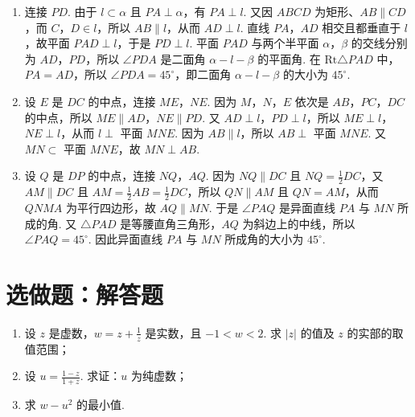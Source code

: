 \documentclass[UTF8,a4paper,oneside,11pt]{ctexbook}
\begin{document}
\begin{solution}
\begin{enumerate}
\item 连接 \(PD\). 由于 \(l\subset\alpha\) 且 \(PA\perp\alpha\)，有 \(PA\perp l\). 又因 \(ABCD\) 为矩形、\(AB\parallel CD\)，而 \(C\)，\(D\in l\)，所以 \(AB\parallel l\)，从而 \(AD\perp l\). 直线 \(PA\)，\(AD\) 相交且都垂直于 \(l\)，故平面 \(PAD\perp l\)，于是 \(PD\perp l\). 平面 \(PAD\) 与两个半平面 \(\alpha\)，\(\beta\) 的交线分别为 \(AD\)，\(PD\)，所以 \(\angle PDA\) 是二面角 \(\alpha-l-\beta\) 的平面角. 在 \(\mathrm{Rt}\triangle PAD\) 中，\(PA=AD\)，所以 \(\angle PDA=45^\circ\)，即二面角 \(\alpha-l-\beta\) 的大小为 \(45^\circ\).
\item 设 \(E\) 是 \(DC\) 的中点，连接 \(ME\)，\(NE\). 因为 \(M\)，\(N\)，\(E\) 依次是 \(AB\)，\(PC\)，\(DC\) 的中点，所以 \(ME\parallel AD\)，\(NE\parallel PD\). 又 \(AD\perp l\)，\(PD\perp l\)，所以 \(ME\perp l\)，\(NE\perp l\)，从而 \(l\perp\) 平面 \(MNE\). 因为 \(AB\parallel l\)，所以 \(AB\perp\) 平面 \(MNE\). 又 \(MN\subset\) 平面 \(MNE\)，故 \(MN\perp AB\).
\item 设 \(Q\) 是 \(DP\) 的中点，连接 \(NQ\)，\(AQ\). 因为 \(NQ\parallel DC\) 且 \(NQ=\frac{1}{2}DC\)，又 \(AM\parallel DC\) 且 \(AM=\frac{1}{2}AB=\frac{1}{2}DC\)，所以 \(QN\parallel AM\) 且 \(QN=AM\)，从而 \(QNMA\) 为平行四边形，故 \(AQ\parallel MN\). 于是 \(\angle PAQ\) 是异面直线 \(PA\) 与 \(MN\) 所成的角. 又 \(\triangle PAD\) 是等腰直角三角形，\(AQ\) 为斜边上的中线，所以 \(\angle PAQ=45^\circ\). 因此异面直线 \(PA\) 与 \(MN\) 所成角的大小为 \(45^\circ\).
\end{enumerate}
\end{solution}

\section{选做题：解答题}

\begin{problem}[A]
\begin{enumerate}
\item 设 \(z\) 是虚数，\(w=z+\frac{1}{z}\) 是实数，且 \(-1<w<2\). 求 \(\left|z\right|\) 的值及 \(z\) 的实部的取值范围；
\item 设 \(u=\frac{1-z}{1+z}\). 求证：\(u\) 为纯虚数；
\item 求 \(w-u^{2}\) 的最小值.
\end{enumerate}
\end{problem}
\end{document}
